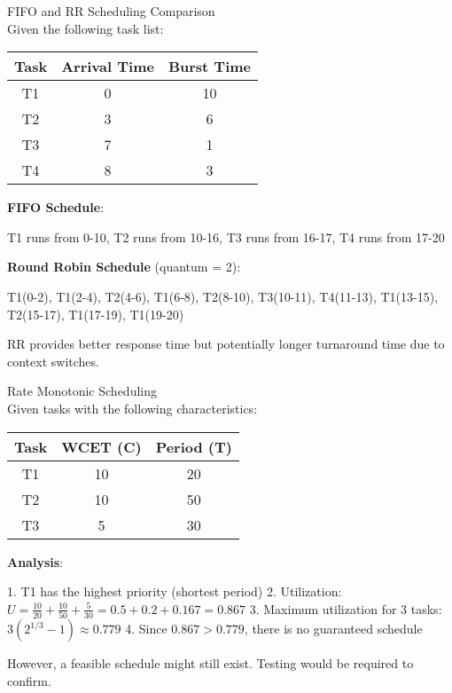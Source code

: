 \begin{example2}{FIFO and RR Scheduling Comparison}\\
    Given the following task list:
    
    \begin{tabular}{|c|c|c|}
        \hline
        Task & Arrival Time & Burst Time \\
        \hline
        T1 & 0 & 10 \\
        T2 & 3 & 6 \\
        T3 & 7 & 1 \\
        T4 & 8 & 3 \\
        \hline
    \end{tabular}
    
    \tcblower
    
    \textbf{FIFO Schedule}:
    
    T1 runs from 0-10, T2 runs from 10-16, T3 runs from 16-17, T4 runs from 17-20
    
    \textbf{Round Robin Schedule} (quantum = 2):
    
    T1(0-2), T1(2-4), T2(4-6), T1(6-8), T2(8-10), T3(10-11), T4(11-13), T1(13-15), T2(15-17), T1(17-19), T1(19-20)
    
    RR provides better response time but potentially longer turnaround time due to context switches.
\end{example2}

\begin{example2}{Rate Monotonic Scheduling}\\
    Given tasks with the following characteristics:
    
    \begin{tabular}{|c|c|c|}
        \hline
        Task & WCET (C) & Period (T) \\
        \hline
        T1 & 10 & 20 \\
        T2 & 10 & 50 \\
        T3 & 5 & 30 \\
        \hline
    \end{tabular}
    
    \tcblower
    
    \textbf{Analysis}:
    
    1. T1 has the highest priority (shortest period)
    2. Utilization: $U = \frac{10}{20} + \frac{10}{50} + \frac{5}{30} = 0.5 + 0.2 + 0.167 = 0.867$
    3. Maximum utilization for 3 tasks: $3(2^{1/3} - 1) \approx 0.779$
    4. Since $0.867 > 0.779$, there is no guaranteed schedule
    
    However, a feasible schedule might still exist. Testing would be required to confirm.
\end{example2}